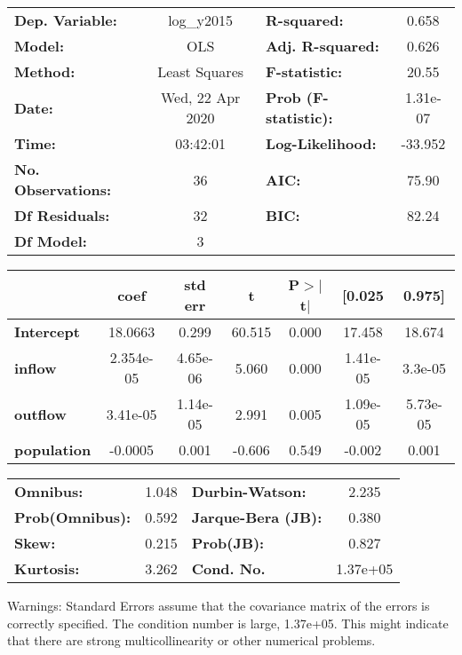 \begin{center}
\begin{tabular}{lclc}
\toprule
\textbf{Dep. Variable:}    &    log\_y2015    & \textbf{  R-squared:         } &     0.658   \\
\textbf{Model:}            &       OLS        & \textbf{  Adj. R-squared:    } &     0.626   \\
\textbf{Method:}           &  Least Squares   & \textbf{  F-statistic:       } &     20.55   \\
\textbf{Date:}             & Wed, 22 Apr 2020 & \textbf{  Prob (F-statistic):} &  1.31e-07   \\
\textbf{Time:}             &     03:42:01     & \textbf{  Log-Likelihood:    } &   -33.952   \\
\textbf{No. Observations:} &          36      & \textbf{  AIC:               } &     75.90   \\
\textbf{Df Residuals:}     &          32      & \textbf{  BIC:               } &     82.24   \\
\textbf{Df Model:}         &           3      & \textbf{                     } &             \\
\bottomrule
\end{tabular}
\begin{tabular}{lcccccc}
                    & \textbf{coef} & \textbf{std err} & \textbf{t} & \textbf{P$> |$t$|$} & \textbf{[0.025} & \textbf{0.975]}  \\
\midrule
\textbf{Intercept}  &      18.0663  &        0.299     &    60.515  &         0.000        &       17.458    &       18.674     \\
\textbf{inflow}     &    2.354e-05  &     4.65e-06     &     5.060  &         0.000        &     1.41e-05    &      3.3e-05     \\
\textbf{outflow}    &     3.41e-05  &     1.14e-05     &     2.991  &         0.005        &     1.09e-05    &     5.73e-05     \\
\textbf{population} &      -0.0005  &        0.001     &    -0.606  &         0.549        &       -0.002    &        0.001     \\
\bottomrule
\end{tabular}
\begin{tabular}{lclc}
\textbf{Omnibus:}       &  1.048 & \textbf{  Durbin-Watson:     } &    2.235  \\
\textbf{Prob(Omnibus):} &  0.592 & \textbf{  Jarque-Bera (JB):  } &    0.380  \\
\textbf{Skew:}          &  0.215 & \textbf{  Prob(JB):          } &    0.827  \\
\textbf{Kurtosis:}      &  3.262 & \textbf{  Cond. No.          } & 1.37e+05  \\
\bottomrule
\end{tabular}
\end{center}

Warnings: \newline
 [1] Standard Errors assume that the covariance matrix of the errors is correctly specified. \newline
 [2] The condition number is large, 1.37e+05. This might indicate that there are \newline
 strong multicollinearity or other numerical problems.